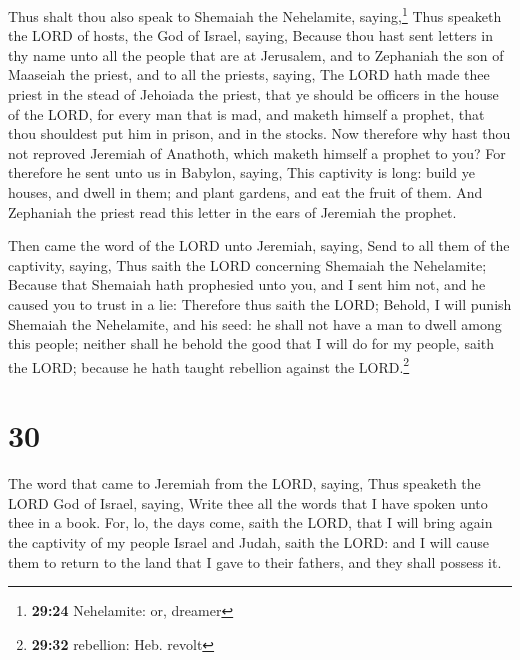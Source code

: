  Thus shalt thou also speak to Shemaiah the Nehelamite,
saying,\footnote{\textbf{29:24} Nehelamite: or, dreamer} 
Thus speaketh the LORD of hosts, the God of Israel, saying, Because thou
hast sent letters in thy name unto all the people that are at Jerusalem,
and to Zephaniah the son of Maaseiah the priest, and to all the priests,
saying,  The LORD hath made thee priest in the stead of
Jehoiada the priest, that ye should be officers in the house of the
LORD, for every man that is mad, and maketh himself a prophet, that thou
shouldest put him in prison, and in the stocks.  Now
therefore why hast thou not reproved Jeremiah of Anathoth, which maketh
himself a prophet to you?  For therefore he sent unto us
in Babylon, saying, This captivity is long: build ye houses, and dwell
in them; and plant gardens, and eat the fruit of them. 
And Zephaniah the priest read this letter in the ears of Jeremiah the
prophet.

 Then came the word of the LORD unto Jeremiah, saying,
 Send to all them of the captivity, saying, Thus saith
the LORD concerning Shemaiah the Nehelamite; Because that Shemaiah hath
prophesied unto you, and I sent him not, and he caused you to trust in a
lie:  Therefore thus saith the LORD; Behold, I will
punish Shemaiah the Nehelamite, and his seed: he shall not have a man to
dwell among this people; neither shall he behold the good that I will do
for my people, saith the LORD; because he hath taught rebellion against
the LORD.\footnote{\textbf{29:32} rebellion: Heb. revolt}

\hypertarget{section-29}{%
\section{30}\label{section-29}}

 The word that came to Jeremiah from the LORD, saying,
 Thus speaketh the LORD God of Israel, saying, Write thee
all the words that I have spoken unto thee in a book. 
For, lo, the days come, saith the LORD, that I will bring again the
captivity of my people Israel and Judah, saith the LORD: and I will
cause them to return to the land that I gave to their fathers, and they
shall possess it.

